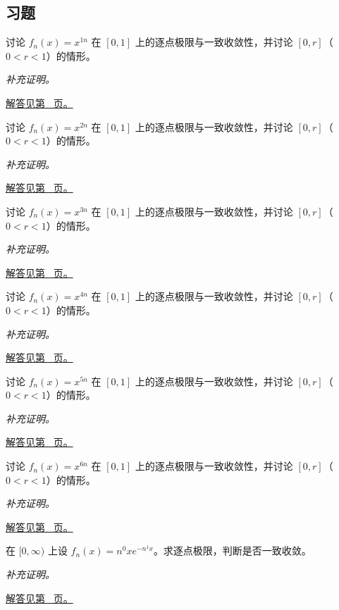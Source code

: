 \documentclass[UTF8,12pt,a4paper,fontset=fandol]{ctexart}
\begin{document}
\subsection{习题}
\begin{example}[边界层导致不一致收敛]\label{ex:c28q1}
讨论 $f_n(x)=x^{1n}$ 在 $[0,1]$ 上的逐点极限与一致收敛性，并讨论 $[0,r]$（$0<r<1$）的情形。
\par\textit{补充证明。}\par\hyperref[ans:c28q1]{解答见第~\pageref{ans:c28q1} 页。}
\end{example}
\begin{example}[边界层导致不一致收敛]\label{ex:c28q2}
讨论 $f_n(x)=x^{2n}$ 在 $[0,1]$ 上的逐点极限与一致收敛性，并讨论 $[0,r]$（$0<r<1$）的情形。
\par\textit{补充证明。}\par\hyperref[ans:c28q2]{解答见第~\pageref{ans:c28q2} 页。}
\end{example}
\begin{example}[边界层导致不一致收敛]\label{ex:c28q3}
讨论 $f_n(x)=x^{3n}$ 在 $[0,1]$ 上的逐点极限与一致收敛性，并讨论 $[0,r]$（$0<r<1$）的情形。
\par\textit{补充证明。}\par\hyperref[ans:c28q3]{解答见第~\pageref{ans:c28q3} 页。}
\end{example}
\begin{example}[边界层导致不一致收敛]\label{ex:c28q4}
讨论 $f_n(x)=x^{4n}$ 在 $[0,1]$ 上的逐点极限与一致收敛性，并讨论 $[0,r]$（$0<r<1$）的情形。
\par\textit{补充证明。}\par\hyperref[ans:c28q4]{解答见第~\pageref{ans:c28q4} 页。}
\end{example}
\begin{example}[边界层导致不一致收敛]\label{ex:c28q5}
讨论 $f_n(x)=x^{5n}$ 在 $[0,1]$ 上的逐点极限与一致收敛性，并讨论 $[0,r]$（$0<r<1$）的情形。
\par\textit{补充证明。}\par\hyperref[ans:c28q5]{解答见第~\pageref{ans:c28q5} 页。}
\end{example}
\begin{example}[边界层导致不一致收敛]\label{ex:c28q6}
讨论 $f_n(x)=x^{6n}$ 在 $[0,1]$ 上的逐点极限与一致收敛性，并讨论 $[0,r]$（$0<r<1$）的情形。
\par\textit{补充证明。}\par\hyperref[ans:c28q6]{解答见第~\pageref{ans:c28q6} 页。}
\end{example}
\begin{example}[移动峰值的函数列]\label{ex:c28q7}
在 $[0,\infty)$ 上设 $f_n(x)=n^{0}x e^{-n^{1}x}$。求逐点极限，判断是否一致收敛。
\par\textit{补充证明。}\par\hyperref[ans:c28q7]{解答见第~\pageref{ans:c28q7} 页。}
\end{example}
\end{document}
